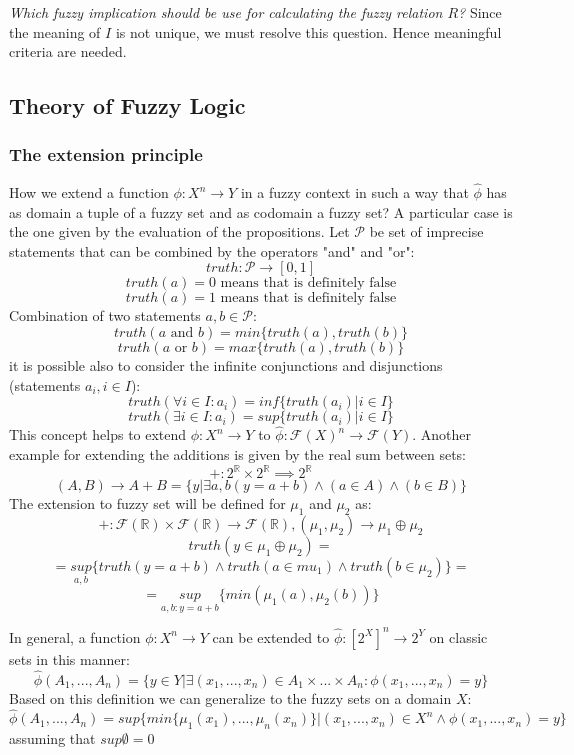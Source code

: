 \documentclass{article}
\begin{document}
\textit{Which fuzzy implication should be use for
    calculating the fuzzy relation $R$?} Since the meaning of $I$ is not unique, we must resolve this
question. Hence meaningful criteria are needed.

\subsection{Theory of Fuzzy Logic}
\subsubsection{The extension principle}
How we extend a function $\phi:X^n\rightarrow Y$ in a fuzzy context in such a way that $\hat{\phi}$
has as domain a tuple of a fuzzy set and as codomain a fuzzy set? A particular case is the
one given by the evaluation of the propositions.
\newline\newline
Let $\mathcal{P}$ be set of imprecise statements that can be combined by the operators "and" and "or":
$$truth:\mathcal{P}\rightarrow[0,1]$$
$$truth(a)=0 \text{ means that is definitely false}$$
$$truth(a)=1\text{ means that is definitely false}$$
Combination of two statements $a,b\in\mathcal{P}$:
$$truth(a \text{ and } b)=min\{truth(a),truth(b)\}$$
$$truth(a \text{ or } b)=max\{truth(a),truth(b)\}$$
it is possible also to consider the infinite conjunctions and disjunctions (statements $a_i,i \in I$):
$$truth(\forall i\in I:a_i)=inf\{truth(a_i)|i\in I\}$$
$$truth(\exists i\in I:a_i)=sup\{truth(a_i)|i\in I\}$$
This concept helps to extend $\phi:X^n \rightarrow Y$ to $\hat{\phi}:\mathcal{F}(X)^n \rightarrow\mathcal{F}(Y)$.
Another example for extending the additions is given by the real sum between sets:
$$+:2^{\mathbb{R}}\times 2^{\mathbb{R}}\implies 2^{\mathbb{R}}$$
$$(A,B)\rightarrow A+B=\{ y | \exists a,b(y=a+b) \land (a\in A)\land (b\in B)\}$$
The extension to fuzzy set will be defined for $\mu_1$ and $\mu_2$ as:
$$+:\mathcal{F}(\mathbb{R})\times\mathcal{F}(\mathbb{R})\rightarrow \mathcal{F}(\mathbb{R}),(\mu_1,\mu_2)\rightarrow \mu_1 \oplus\mu_2$$
$$truth(y\in \mu_1\oplus\mu_2) =$$
$$=\underset{a,b}{sup}\{truth(y=a+b) \land truth(a\in mu_1)\land truth(b\in \mu_2)\}=$$
$$=\underset{a,b:y=a+b}{sup}\{min(\mu_1(a),\mu_2(b))\}$$

In general, a function $\phi:X^n\rightarrow Y$ can be extended to $\hat{\phi}:[2^X]^n\rightarrow 2^Y$
on classic sets in this manner:
$$\hat{\phi}(A_1,...,A_n)=\{y\in Y|\exists (x_1,...,x_n)\in A_1\times ... \times A_n:
    \phi(x_1,...,x_n)=y\}$$
Based on this definition we can generalize to the fuzzy sets on a domain $X$:
$$\hat{\phi}(A_1,...,A_n)=sup\{min\{\mu_1(x_1),...,\mu_n(x_n)\} | (x_1,...,x_n)\in X^n \land \phi(x_1,...,x_n)=y\}$$
assuming that $sup \emptyset=0$
\end{document}
